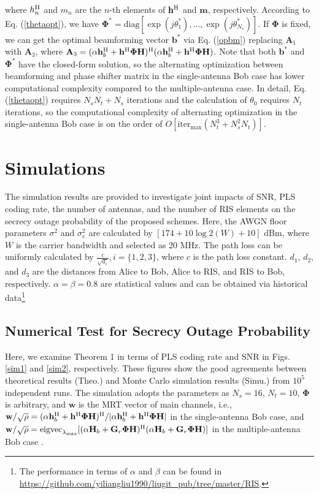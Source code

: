 \documentclass[journal]{IEEEtran}
\theoremstyle{definition}
\begin{document}
where $h^{\rm{H}}_n$ and $m_n$ are the $n$-th elements of $\mathbf{h}^{\rm{H}}$ and $\mathbf{m}$, respectively. According to Eq. (\ref{thetaopt}), we have $\bm{\Phi}^*=\text{diag}[\exp(j\theta_1^*),..., \exp(j\theta_{N_s}^*)]$. If $\bm{\Phi}$ is fixed, we can get the optimal beamforming vector $\mathbf{b}^*$ via Eq. (\ref{opbm}) replacing $\mathbf{A}_1$ with $\mathbf{A}_3$, where $\mathbf{A}_3=(\alpha\mathbf{h}_b^{\rm{H}}+\mathbf{h}^{\rm{H}}\bm{\Phi}\mathbf{H})^{\rm{H}}(\alpha\mathbf{h}_b^{\rm{H}}+\mathbf{h}^{\rm{H}}\bm{\Phi}\mathbf{H})$. Note that both $\mathbf{b}^*$ and $\bm{\Phi}^*$ have the closed-form solution, so the alternating optimization between beamforming and phase shifter matrix in the single-antenna Bob case has lower computational complexity compared to the multiple-antenna case. In detail, Eq. (\ref{thetaopt}) requires $N_sN_t+N_s$ iterations and the calculation of $\theta_0$ requires $N_t$ iterations, so the computational complexity of alternating optimization in the single-antenna Bob case is on the order of $O[\text{iter}_{\max}(N_t^3+N_s^2N_t)]$.

\section{Simulations} \label{simulations}
The simulation results are provided to investigate joint impacts of SNR, PLS coding rate, the number of antennas, and the number of RIS elements on the secrecy outage probability of the proposed schemes. Here, the AWGN floor parameters $\sigma^2$ and $\sigma_e^2$ are calculated by $[174+10\log2(W)+10]$ dBm, where $W$ is the carrier bandwidth and selected as 20 MHz. The path loss can be uniformly calculated by $\frac{c}{\sqrt{d_i}},i=\{1,2,3\}$, where $c$ is the path loss constant. $d_1$,  $d_2$, and $d_3$ are the distances from Alice to Bob, Alice to RIS, and RIS to Bob, respectively. $\alpha=\beta=0.8$ are statistical values and can be obtained via historical data\footnote{The performance in terms of $\alpha$ and $\beta$ can be found in \url{https://github.com/yiliangliu1990/liugit_pub/tree/master/RIS}.}

\subsection{Numerical Test for Secrecy Outage Probability}

Here, we examine Theorem 1 in terms of PLS coding rate and SNR in Figs. \ref{sim1} and \ref{sim2}, respectively. These figures show the good agreements between theoretical results (Theo.) and Monte Carlo simulation results (Simu.) from $10^5$ independent runs. The simulation adopts the parameters as $N_s=16$, $N_t=10$, $\bm{\Phi}$ is arbitrary, and $\mathbf{w}$ is the MRT vector of main channels, i.e., $\mathbf{w}/\sqrt{\rho}=(\alpha \mathbf{h}_b^{\rm{H}}+\mathbf{h}^{\rm{H}}\bm{\Phi}\mathbf{H})^{\rm{H}}/|\alpha \mathbf{h}_b^{\rm{H}}+\mathbf{h}^{\rm{H}}\bm{\Phi}\mathbf{H}|$ in the single-antenna Bob case, and $\mathbf{w}/\sqrt{\rho}=\text{eigvec}_{\lambda_{\max}}[(\alpha\mathbf{H}_b+\mathbf{G}_{r}\bm{\Phi}\mathbf{H})^{\rm{H}}(\alpha\mathbf{H}_b+\mathbf{G}_{r}\bm{\Phi}\mathbf{H})]$ in the multiple-antenna Bob case \cite{Kang2003}.
\end{document}
